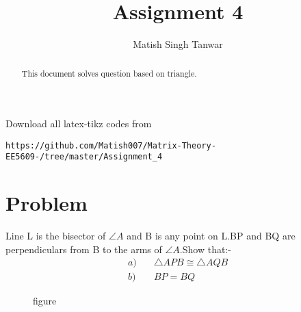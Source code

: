 \documentclass[journal,12pt,twocolumn]{IEEEtran}
\begin{document}
 \vspace{3cm}
 \title{Assignment 4}
 \author{Matish Singh Tanwar}
 \maketitle
 \newpage
 \bigskip
 \renewcommand{\thetable}{\theenumi}
\vspace{1.0cm}
\begin{abstract}
This document solves question based on triangle.
\end{abstract}
\vspace{0.5cm}
%
Download all latex-tikz codes from 
\begin{lstlisting}
https://github.com/Matish007/Matrix-Theory-EE5609-/tree/master/Assignment_4
\end{lstlisting}
%
\vspace{0.5mm}
\section{Problem}
Line L is the bisector of $\angle{A}$ and B is any point on L.BP and BQ are perpendiculars from B to the arms of $\angle{A}$.Show that:-
\begin{align}
    a) &\quad \triangle APB \cong\triangle AQB\\
    b) & \quad BP=BQ
\end{align}
\renewcommand{\thefigure}{1}
\begin{figure}[!ht]
\centering
\resizebox{\columnwidth}{!}{}
\caption{figure}
\label{fig1}
\end{figure}
\end{document}
